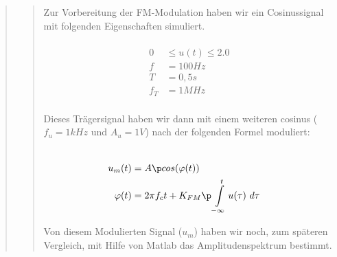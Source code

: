 \begin{quote}
\begin{quote}
        
        Zur Vorbereitung der FM-Modulation haben wir ein Cosinussignal mit folgenden Eigenschaften simuliert.
        
        \begin{equation*}
        \begin{split}
        \\
                 0 &\leq u(t) \leq 2.0
        \\
                 f &= \si{100}{Hz}
        \\
                 T &= \si{0,5}{s}
        \\
               f_T &= \si{1}{MHz}
        \\
        \end{split}
        \end{equation*}
        
        
        Dieses Trägersignal haben wir dann mit einem weiteren cosinus ($f_u = 1kHz$ und $A_u = 1V$) nach der folgenden Formel
        moduliert:
        
        \begin{equation*}
        \begin{split}
        \\
                u_m(t) &= A \p cos(\varphi(t))
        \\
            \varphi(t) &= 2 \pi f_c t + K_{FM} \p \int\limits_{-\infty}^t u(\tau) \ d\tau  
        \\
        \end{split}
        \end{equation*}
        \label{equ:fm}
        
        Von diesem Modulierten Signal ($u_m$) haben wir noch, zum späteren Vergleich, mit Hilfe von Matlab das Amplitudenspektrum
        bestimmt.
        
        
    \end{quote}
    
    

\end{quote}
